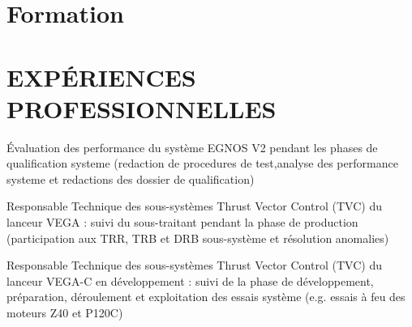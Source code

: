 \documentclass[]{deedy-resume-openfont}
\begin{document}
\hfill
\begin{minipage}[t]{0.58\textwidth} 
\hfill
\sectionsep

\section{Formation} 
\vspace{\topsep} %

\sectionsep


\hfill


\section{EXPÉRIENCES PROFESSIONNELLES}
\vspace{\topsep} %
\begin{tightemize}
\item Évaluation des performance du système EGNOS V2 pendant les phases de qualification systeme (redaction de procedures de test,analyse des performance systeme et redactions des dossier de qualification) \\
\end{tightemize}
\sectionsep

\vspace{\topsep} %
\vspace{\topsep} %
\begin{tightemize}
\item Responsable Technique des sous-systèmes Thrust Vector Control (TVC) du lanceur VEGA : suivi du sous-traitant pendant la phase de production (participation aux TRR, TRB et DRB sous-système et résolution anomalies) \\
\item Responsable Technique des sous-systèmes Thrust Vector Control (TVC) du lanceur VEGA-C en développement : suivi de la phase de développement, préparation, déroulement et exploitation des essais système (e.g. essais à feu des moteurs Z40 et P120C)\\
\end{tightemize}
\sectionsep


\end{minipage}
\end{document}
